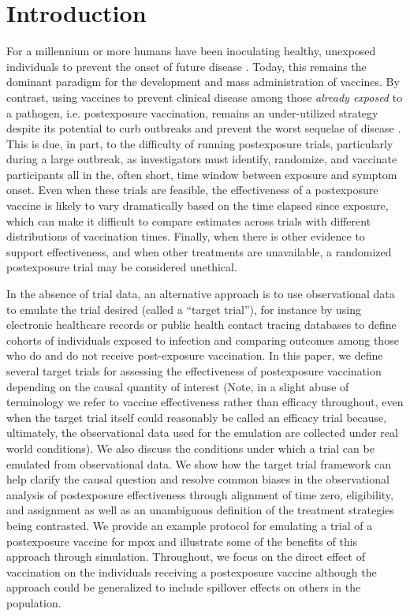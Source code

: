 \documentclass[11pt]{article}
\begin{document}
\section{Introduction} \label{sec:introduction}
For a millennium or more humans have been inoculating healthy, unexposed individuals to prevent the onset of future disease \cite{plotkin2012vaccines}. Today, this remains the dominant paradigm for the development and mass administration of vaccines. By contrast, using vaccines to prevent clinical disease among those \textit{already exposed} to a pathogen, i.e. postexposure vaccination, remains an under-utilized strategy despite its potential to curb outbreaks and prevent the worst sequelae of disease \cite{gallagher_postexposure_2019}. This is due, in part, to the difficulty of running postexposure trials, particularly during a large outbreak, as investigators must identify, randomize, and vaccinate participants all in the, often short, time window between exposure and symptom onset. Even when these trials are feasible, the effectiveness of a postexposure vaccine is likely to vary dramatically based on the time elapsed since exposure, which can make it difficult to compare estimates across trials with different distributions of vaccination times. Finally, when there is other evidence to support effectiveness, and when other treatments are unavailable, a randomized postexposure trial may be considered unethical.

In the absence of trial data, an alternative approach is to use observational data to emulate the trial desired \cite{hernan_observational_2008,hernan_using_2016} (called a ``target trial''), for instance by using electronic healthcare records or public health contact tracing databases to define cohorts of individuals exposed to infection and comparing outcomes among those who do and do not receive post-exposure vaccination. In this paper, we define several target trials for assessing the effectiveness of postexposure vaccination depending on the causal quantity of interest (Note, in a slight abuse of terminology we refer to vaccine effectiveness rather than efficacy throughout, even when the target trial itself could reasonably be called an efficacy trial because, ultimately, the observational data used for the emulation are collected under real world conditions). We also discuss the conditions under which a trial can be emulated from observational data. We show how the target trial framework can help clarify the causal question and resolve common biases in the observational analysis of postexposure effectiveness through alignment of time zero, eligibility, and assignment as well as an unambiguous definition of the treatment strategies being contrasted. We provide an example protocol for emulating a trial of a postexposure vaccine for mpox and illustrate some of the benefits of this approach through simulation. Throughout, we focus on the direct effect of vaccination \cite{halloran_design_2010} on the individuals receiving a postexposure vaccine although the approach could be generalized to include spillover effects on others in the population.
\end{document}
